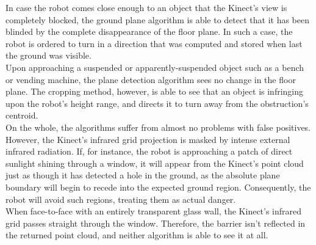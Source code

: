\documentclass[12pt]{report}
\begin{document}
In case the robot comes close enough to an object that the Kinect's view is completely blocked, the ground plane algorithm is able to detect that it has been blinded by the complete disappearance of the floor plane.  In such a case, the robot is ordered to turn in a direction that was computed and stored when last the ground was visible. \\
Upon approaching a suspended or apparently-suspended object such as a bench or vending machine, the plane detection algorithm sees no change in the floor plane.  The cropping method, however, is able to see that an object is infringing upon the robot's height range, and directs it to turn away from the obstruction's centroid. \\
On the whole, the algorithms suffer from almost no problems with false positives.  However, the Kinect's infrared grid projection is masked by intense external infrared radiation.  If, for instance, the robot is approaching a patch of direct sunlight shining through a window, it will appear from the Kinect's point cloud just as though it has detected a hole in the ground, as the absolute plane boundary will begin to recede into the expected ground region.  Consequently, the robot will avoid such regions, treating them as actual danger. \\
When face-to-face with an entirely transparent glass wall, the Kinect's infrared grid passes straight through the window.  Therefore, the barrier isn't reflected in the returned point cloud, and neither algorithm is able to see it at all.
\end{document}
